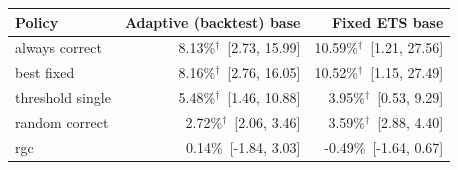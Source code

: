 \begin{tabular}{lrr}
\toprule
Policy & Adaptive (backtest) base & Fixed ETS base \\
\midrule
always correct & 8.13\%$^\dagger$~[2.73, 15.99] & 10.59\%$^\dagger$~[1.21, 27.56] \\
best fixed & 8.16\%$^\dagger$~[2.76, 16.05] & 10.52\%$^\dagger$~[1.15, 27.49] \\
threshold single & 5.48\%$^\dagger$~[1.46, 10.88] & 3.95\%$^\dagger$~[0.53, 9.29] \\
random correct & 2.72\%$^\dagger$~[2.06, 3.46] & 3.59\%$^\dagger$~[2.88, 4.40] \\
rgc & 0.14\%~[-1.84, 3.03] & -0.49\%~[-1.64, 0.67] \\
\bottomrule
\end{tabular}
